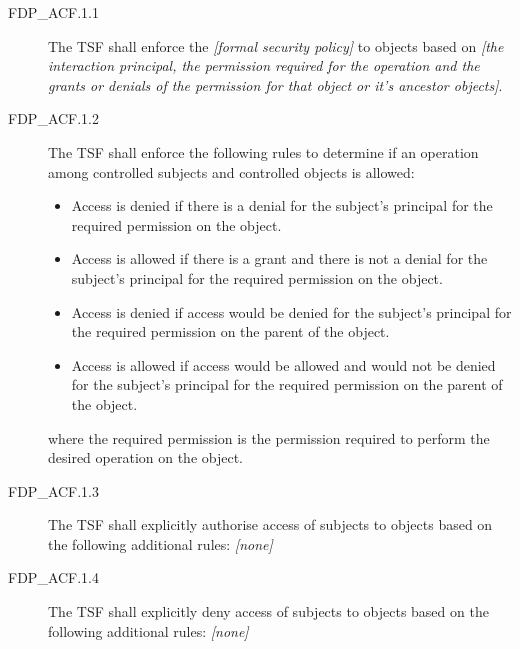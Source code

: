 \documentclass[12pt,english]{scrbook}
\begin{document}
\begin{description}
\item[FDP{\_}ACF.1.1]

The TSF shall enforce the \emph{{[}formal security policy]} to objects
based on \emph{{[}the interaction principal, the permission required for
the operation and the grants or denials of the permission for that
object or it's ancestor objects]}.

\item[FDP{\_}ACF.1.2]

The TSF shall enforce the following rules to determine
if an operation among controlled subjects and controlled objects is
allowed:
\begin{itemize}
\item {} 
Access is denied if there is a denial for the subject's
principal for the required permission on the object.

\item {} 
Access is allowed if there is a grant and there is not a denial
for the subject's principal for the required permission on the object.

\item {} 
Access is denied if access would be denied for the subject's
principal for the required permission on the parent of the
object.

\item {} 
Access is allowed if access would be allowed and would not be
denied for the subject's principal for the required permission
on the parent of the object.

\end{itemize}

where the required permission is the permission required to
perform the desired operation on the object.

\item[FDP{\_}ACF.1.3]

The TSF shall explicitly authorise access of subjects to
objects based on the following additional rules: \emph{{[}none]}

\item[FDP{\_}ACF.1.4]

The TSF shall explicitly deny access of subjects to objects
based on the following additional rules: \emph{{[}none]}

\end{description}
\end{document}
